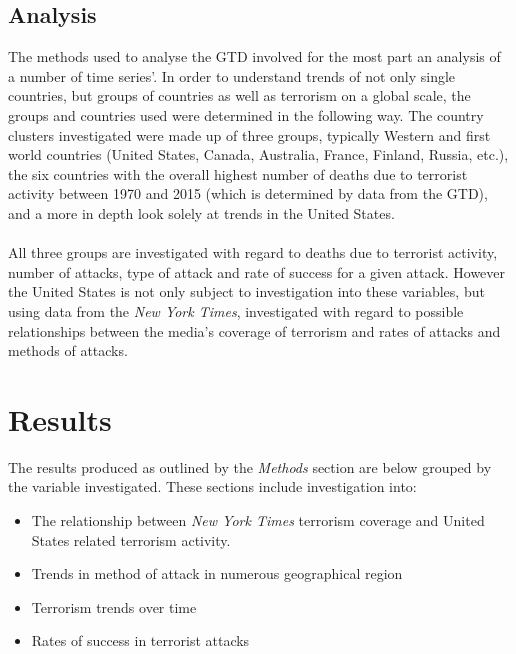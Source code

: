 \documentclass[10pt,a4paper]{article}
\begin{document}
\subsection{Analysis}
The methods used to analyse the GTD involved for the most part an analysis of a number of time series'. In order to understand trends of not only single countries, but groups of countries as well as terrorism on a global scale, the groups and countries used were determined in the following way. The country clusters investigated were made up of three groups, typically Western and first world countries (United States, Canada, Australia, France, Finland, Russia, etc.), the six countries with the overall highest number of deaths due to terrorist activity between 1970 and 2015 (which is determined by data from the GTD), and a more in depth look solely at trends in the United States.
\\\\
All three groups are investigated with regard to deaths due to terrorist activity, number of attacks, type of attack and rate of success for a given attack. However the United States is not only subject to investigation into these variables, but using data from the \textit{New York Times}, investigated with regard to possible relationships between the media's coverage of terrorism and rates of attacks and methods of attacks.


\section{Results}
The results produced as outlined by the \textit{Methods} section are below grouped by the variable investigated. These sections include investigation into:\\
\begin{itemize}
\item The relationship between \textit{New York Times} terrorism coverage and United States related terrorism activity.
\item Trends in method of attack in numerous geographical region
\item Terrorism trends over time
\item Rates of success in terrorist attacks 

\end{itemize}
\end{document}
